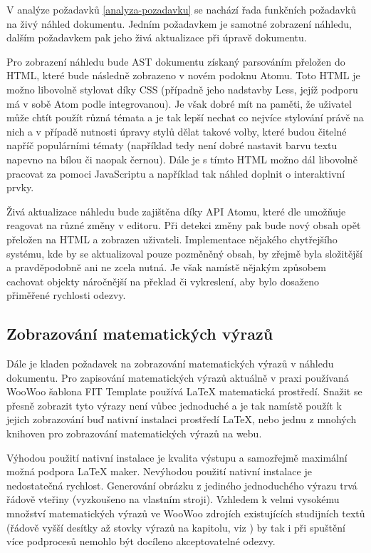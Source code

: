 V analýze požadavků \ref{analyza-pozadavku} se nachází řada funkčních požadavků na živý náhled dokumentu. Jedním
požadavkem je samotné zobrazení náhledu, dalším požadavkem pak jeho živá aktualizace při úpravě dokumentu.

Pro zobrazení náhledu bude AST dokumentu získaný parsováním přeložen do HTML, které bude následně zobrazeno v novém
podoknu Atomu. Toto HTML je možno libovolně stylovat díky CSS (případně jeho nadstavby Less, jejíž podporu má v sobě
Atom podle \cite{atom-docs} integrovanou). Je však dobré mít na paměti, že uživatel může chtít použít různá témata a je
tak lepší nechat co nejvíce stylování právě na nich a v případě nutnosti úpravy stylů dělat takové volby, které budou
čitelné napříč populárními tématy (například tedy není dobré nastavit barvu textu napevno na bílou či naopak černou).
Dále je s tímto HTML možno dál libovolně pracovat za pomoci JavaScriptu a například tak náhled doplnit o interaktivní
prvky.

Živá aktualizace náhledu bude zajištěna díky API Atomu, které dle \cite{atom-docs} umožňuje reagovat na různé změny v
editoru. Při detekci změny pak bude nový obsah opět přeložen na HTML a zobrazen uživateli. Implementace nějakého
chytřejšího systému, kde by se aktualizoval pouze pozměněný obsah, by zřejmě byla složitější a pravděpodobně ani ne
zcela nutná. Je však namístě nějakým způsobem cachovat objekty náročnější na překlad či vykreslení, aby bylo dosaženo
přiměřené rychlosti odezvy.

\subsection{Zobrazování matematických výrazů}

Dále je kladen požadavek na zobrazování matematických výrazů v náhledu dokumentu. Pro zapisování matematických výrazů
aktuálně v praxi používaná WooWoo šablona FIT Template používá \LaTeX{} matematická prostředí. Snažit se přesně zobrazit
tyto výrazy není vůbec jednoduché a je tak namístě použít k jejich zobrazování buď nativní instalaci prostředí \LaTeX{},
nebo jednu z mnohých knihoven pro zobrazování matematických výrazů na webu.

Výhodou použití nativní instalace je kvalita výstupu a samozřejmě maximální možná podpora \LaTeX{} maker. Nevýhodou
použití nativní instalace je nedostatečná rychlost. Generování obrázku z jediného jednoduchého výrazu trvá řádově
vteřiny (vyzkoušeno na vlastním stroji). Vzhledem k velmi vysokému množství matematických výrazů ve WooWoo zdrojích
existujících studijních textů (řádově vyšší desítky až stovky výrazů na kapitolu, viz \cite{pkm}) by tak i při spuštění
více podprocesů nemohlo být docíleno akceptovatelné odezvy.

